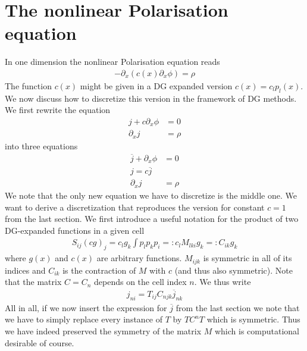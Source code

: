 \documentclass[a4paper,12pt]{scrartcl}
\begin{document}
\section{ The nonlinear Polarisation equation}

In one dimension the nonlinear Polarisation equation reads
\begin{align}
    -\partial_x ( c(x) \partial_x \phi) = \rho
    \label{}
\end{align}
The function $c(x)$ might be given in a DG expanded version $c(x) = c_lp_l(x)$.
We now discuss how to discretize this version in the framework of DG methods. 
We first rewrite the equation 
\begin{subequations}
    \begin{align}
      j + c\partial_x \phi &= 0\\
      \partial_x j &= \rho
        \label{}
    \end{align}
    \label{}
\end{subequations}
into three equations
\begin{subequations}
    \begin{align}
      \overline j + \partial_x \phi &= 0\\
      j = c\overline j\\
      \partial_x j &= \rho
        \label{}
    \end{align}
    \label{}
\end{subequations}
We note that the only new equation we have to discretize is the middle one.
We want to derive a discretization that 
reproduces the version for constant $c=1$ from the last section. 
We first introduce a useful notation for the product of two DG-expanded functions
in a given cell
\begin{align}
    S_{ij}(cg)_j = c_l g_k \int p_l p_k p_i =: c_l M_{lki} g_k =: C_{ik}g_k 
    \label{}
\end{align}
where $g(x)$ and $c(x)$ are arbitrary functions.
$M_{ijk}$ is symmetric in all of its indices and $C_{ik}$ is the 
contraction of $M$ with $c$ (and thus also symmetric). 
Note that the matrix $C = C_n$ 
depends on the cell index $n$. We thus write
\begin{align}
    j_{ni} = T_{ij}C_{njk}\overline j_{nk}
    \label{}
\end{align}
All in all, if we now insert the expression for $\overline j$ from the last section
we note that we have to simply replace every instance of $T$ by $TC^nT$ 
which is symmetric. Thus we have indeed preserved the symmetry of the matrix $M$ 
which is computational desirable of course. 
\end{document}

